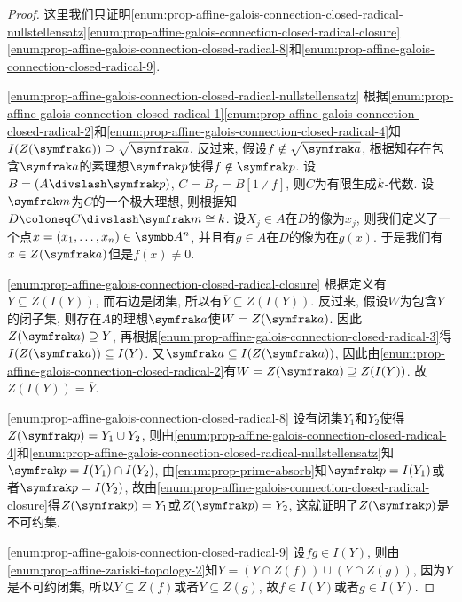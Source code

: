\begin{proof}
  这里我们只证明\ref{enum:prop-affine-galois-connection-closed-radical-nullstellensatz}\ref{enum:prop-affine-galois-connection-closed-radical-closure}\ref{enum:prop-affine-galois-connection-closed-radical-8}和\ref{enum:prop-affine-galois-connection-closed-radical-9}.

  \ref{enum:prop-affine-galois-connection-closed-radical-nullstellensatz} 根据\ref{enum:prop-affine-galois-connection-closed-radical-1}\ref{enum:prop-affine-galois-connection-closed-radical-2}和\ref{enum:prop-affine-galois-connection-closed-radical-4}知$I(Z(\ideal{a}))\supseteq\sqrt{\ideal{a}}$. 反过来, 假设$f\notin\sqrt{\ideal{a}}$, 根据知存在包含$\ideal{a}$的素理想$\ideal{p}$使得$f\notin\ideal{p}$. 设$B=(A{\divslash}\ideal{p})$, $C=B_{f}=B[1{\divslash}f]$, 则$C$为有限生成$k$-代数. 设$\ideal{m}$为$C$的一个极大理想, 则根据知$D\coloneq C{\divslash}\ideal{m}\cong\kk$. 设$X_j\in A$在$D$的像为$x_j$, 则我们定义了一个点$x=(x_1, \dotsc, x_n)\in \AF^n$, 并且有$g\in A$在$D$的像为在$g(x)$. 于是我们有$x\in Z(\ideal{a})$但是$f(x)\neq 0$.

  \ref{enum:prop-affine-galois-connection-closed-radical-closure} 根据定义有$Y\subseteq Z(I(Y))$, 而右边是闭集, 所以有$\overline{Y}\subseteq Z(I(Y))$. 反过来, 假设$W$为包含$Y$的闭子集, 则存在$A$的理想$\ideal{a}$使$W=Z(\ideal{a})$. 因此$Z(\ideal{a})\supseteq Y$, 再根据\ref{enum:prop-affine-galois-connection-closed-radical-3}得$I(Z(\ideal{a}))\subseteq I(Y)$. 又$\ideal{a}\subseteq I(Z(\ideal{a}))$, 因此由\ref{enum:prop-affine-galois-connection-closed-radical-2}有$W=Z(\ideal{a})\supseteq Z(I(Y))$. 故$Z(I(Y))=\overline{Y}$.

  \ref{enum:prop-affine-galois-connection-closed-radical-8} 设有闭集$Y_1$和$Y_2$使得$Z(\ideal{p})=Y_1\cup Y_2$, 则由\ref{enum:prop-affine-galois-connection-closed-radical-4}和\ref{enum:prop-affine-galois-connection-closed-radical-nullstellensatz}知$\ideal{p}=I(Y_1)\cap I(Y_2)$, 由\ref{enum:prop-prime-absorb}知$\ideal{p}=I(Y_1)$或者$\ideal{p}=I(Y_2)$, 故由\ref{enum:prop-affine-galois-connection-closed-radical-closure}得$Z(\ideal{p})=Y_1$或$Z(\ideal{p})=Y_2$, 这就证明了$Z(\ideal{p})$是不可约集.

  \ref{enum:prop-affine-galois-connection-closed-radical-9} 设$fg\in I(Y)$, 则由\ref{enum:prop-affine-zariski-topology-2}知$Y=(Y\cap Z(f))\cup (Y\cap Z(g))$, 因为$Y$是不可约闭集, 所以$Y\subseteq Z(f)$或者$Y\subseteq Z(g)$, 故$f\in I(Y)$或者$g\in I(Y)$.
\end{proof}


